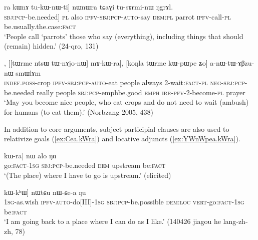 \begin{exe}
\ex \label{ex:kAnWtsW.kWra}
\gll [kɤ-nɯtsɯ kɯ-ra] ra kɯnɤ tu-kɯ-nɯ-ti] nɯnɯra tɕaɣi tu-sɤrmi-nɯ ŋgrɤl. \\
[[[\textsc{inf}-hide] \textsc{sbj}:\textsc{pcp}-be.needed] \textsc{pl} also \textsc{ipfv}-\textsc{sbj}:\textsc{pcp}-\textsc{auto}-say \textsc{dem}:\textsc{pl} parrot \textsc{ipfv}-call-\textsc{pl} be.usually.the.case:\textsc{fact} \\
\glt `People call `parrots' those who say (everything), including things that should (remain) hidden.' (24-qro, 131)
\end{exe}

\begin{exe}
\ex \label{ex:tWnAjonW.kWra}
, [[tɯrme ntsɯ tɯ-nɤjo-nɯ] mɤ-kɯ-ra], [koŋla tɯrme kɯ-pɯ\redp{}pe ʑo] a-nɯ-tɯ-ɤβzu-nɯ smɯlɤm \\
\textsc{indef}.\textsc{poss}-crop \textsc{ipfv}-\textsc{sbj}:\textsc{pcp}-\textsc{auto}-eat people always 2-wait:\textsc{fact}-\textsc{pl} \textsc{neg}-\textsc{sbj}:\textsc{pcp}-be.needed really people \textsc{sbj}:\textsc{pcp}-emph\redp{}be.good \textsc{emph} \textsc{irr}-\textsc{pfv}-2-become-\textsc{pl} prayer \\
\glt `May you become nice people, who eat crops and do not need to wait (ambush) for humans (to eat them).' (Norbzang 2005, 438)
\end{exe}

In addition to core arguments, subject participial clauses are also used to relativize goals (\ref{ex:Cea.kWra}) and locative adjuncts (\ref{ex:YWnWpea.kWra}).
 
\begin{exe}
\ex \label{ex:Cea.kWra}
\gll [[ɕe-a] kɯ-ra] nɯ alo ŋu \\
go:\textsc{fact}-\textsc{1sg} \textsc{sbj}:\textsc{pcp}-be.needed \textsc{dem} upstream be:\textsc{fact} \\
\glt  `(The place) where I have to go is upstream.' (elicited)
\end{exe}

\begin{exe}
\ex \label{ex:YWnWpea.kWra}
\gll [[aʑo-sɯso ɲɯ-nɯ-pe-a] kɯ-kʰɯ] nɯtɕu nɯ-ɕe-a ŋu \\
\textsc{1sg}-as.wish \textsc{ipfv}-\textsc{auto}-do[III]-\textsc{1sg} \textsc{sbj}:\textsc{pcp}-be.possible \textsc{dem}:\textsc{loc} \textsc{vert}-go:\textsc{fact}-\textsc{1sg} be:\textsc{fact} \\
\glt  `I am going back to a place where I can do as I like.' (140426 jiagou he lang-zh-zh, 78)
\end{exe}

